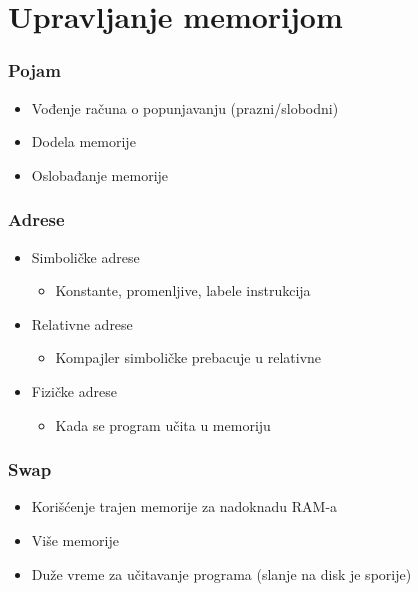 \documentclass{beamer}
\begin{document}
\section*{Upravljanje memorijom}
\begin{frame}
    \frametitle{Pojam}
    \begin{itemize}
        \item Vođenje računa o popunjavanju (prazni/slobodni) \newline
        \item Dodela memorije \newline
        \item Oslobađanje memorije
    \end{itemize}
\end{frame}

\begin{frame}
    \frametitle{Adrese}
    \begin{itemize}
        \item Simboličke adrese \begin{itemize}
            \item Konstante, promenljive, labele instrukcija \newline
        \end{itemize}
        \item Relativne adrese \begin{itemize}
            \item Kompajler simboličke prebacuje u relativne \newline
        \end{itemize}
        \item Fizičke adrese \begin{itemize}
            \item Kada se program učita u memoriju
        \end{itemize}
    \end{itemize}
\end{frame}

\begin{frame}
    \frametitle{Swap}
    \begin{itemize}
        \item Korišćenje trajen memorije za nadoknadu RAM-a \newline
        \item Više memorije \newline
        \item Duže vreme za učitavanje programa (slanje na disk je sporije)
    \end{itemize}
\end{frame}
\end{document}
